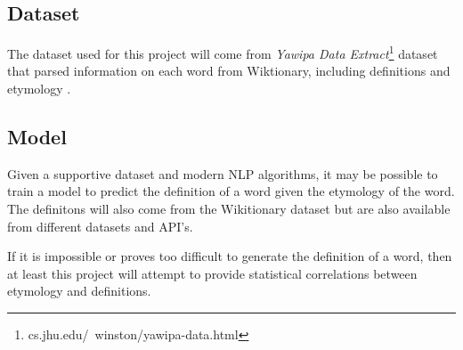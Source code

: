 \documentclass[a4paper,12pt]{article}
\begin{document}
\subsection{Dataset}
The dataset used for this project will come from \textit{Yawipa Data
    Extract}\footnote{cs.jhu.edu/~winston/yawipa-data.html} dataset that parsed
information on each word from Wiktionary, including definitions and
etymology \cite{wu_computational_2020}.

\subsection{Model}
Given a supportive dataset and modern NLP algorithms, it may be possible to
train a model to predict the definition of a word given the etymology of the
word. The definitons will also come from the Wikitionary dataset but are also
available from different datasets and API's.

If it is impossible or proves too difficult to generate the definition of a
word, then at least this project will attempt to provide statistical
correlations between etymology and definitions.



\end{document}
